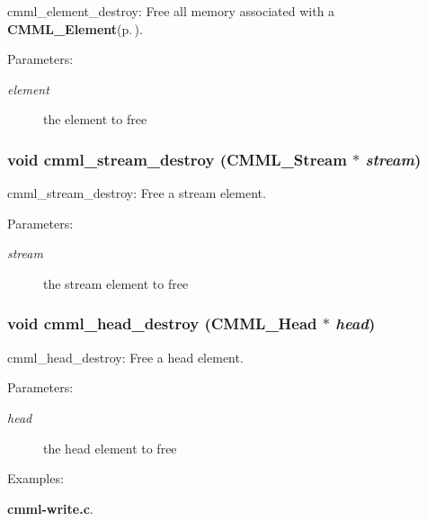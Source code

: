 cmml\_\-element\_\-destroy: Free all memory associated with a {\bf CMML\_\-Element}{\rm (p.\,\pageref{structCMML__Element})}.

\begin{Desc}
\item[Parameters:]
\begin{description}
\item[{\em element}]the element to free \end{description}
\end{Desc}
\subsubsection{\setlength{\rightskip}{0pt plus 5cm}void cmml\_\-stream\_\-destroy ({\bf CMML\_\-Stream} $\ast$ {\em stream})}\label{cmml_8h_a69}


cmml\_\-stream\_\-destroy: Free a stream element.

\begin{Desc}
\item[Parameters:]
\begin{description}
\item[{\em stream}]the stream element to free \end{description}
\end{Desc}
\subsubsection{\setlength{\rightskip}{0pt plus 5cm}void cmml\_\-head\_\-destroy ({\bf CMML\_\-Head} $\ast$ {\em head})}\label{cmml_8h_a70}


cmml\_\-head\_\-destroy: Free a head element.

\begin{Desc}
\item[Parameters:]
\begin{description}
\item[{\em head}]the head element to free \end{description}
\end{Desc}
\begin{Desc}
\item[Examples: ]\par
{\bf cmml-write.c}.\end{Desc}
